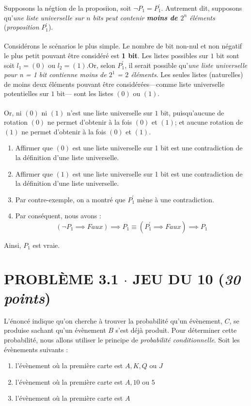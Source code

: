 \documentclass[8pt]{report}
\newcommand{\varitem}[3][black]{%
  \item[%
   \colorbox{#2}{\textcolor{#1}{\makebox(5.5,7){#3}}}%
  ]
}
\begin{document}
        Supposons la négtion de la proposiion, soit $\neg P_1 = P_1^{\prime}$. 
        Autrement dit, supposons qu'\textit{une liste universelle sur 
        $n$ bits peut contenir \textbf{moins de $2^n$} éléments} (\textit{proposition} $P_1^{\prime}$).  
        \\\\ 
        Considérons le scénarios le plus simple. Le nombre de bit non-nul et non négatif le 
        plus petit pouvant être considéré 
        est \textbf{1 bit}. Les listes possibles sur $1$ bit sont soit $l_1= (0)$ ou $l_2 = (1)$.Or, 
        selon $P_1^{\prime}$, il serait possible 
        qu'\textit{une liste universelle pour n = 1 bit contienne moins de $2^1$ = $2$ éléments}. 
        Les seules listes (naturelles) 
        de moins deux éléments pouvant être considérées—comme liste universelle potentielles sur $1$ bit—
        sont les listes $(0)$ ou $(1)$. 
        \\\\
        Or, ni $(0)$ ni $(1)$ n'est une liste universelle sur 
        $1$ bit, puisqu'aucune de rotation $(0)$ ne permet d'obtenir à la fois $(0)$ et $(1)$; et aucune rotation 
        de $(1)$ ne permet d'obtenir à la fois $(0)$ et $(1)$. 
        \begin{enumerate}
            \item Affirmer que $(0)$ est une liste universelle sur 1 bit est une contradiction de la définition 
                d'une liste universelle. 
            \item Affirmer que $(1)$ est une liste universelle sur 1 bit est une contradiction de la définition 
                d'une liste universelle. 
 
            \item Par contre-exemple, on a montré que $P_1^{\prime}$ mène à une contradiction.
            \item Par conséquent, nous avons : 
                \[ (\neg P_1 \implies Faux) \implies P_1 \equiv (P_1^{\prime} \implies Faux) \implies P_1 \]     
        \end{enumerate}
        Ainsi, $P_1$ est vraie. 


\section*{\textnormal{PROBLÈME 3.1 \;\;\;\; $\cdot$ \;\;\;\; JEU DU 10 \hspace*{\fill} (\textit{30 points})}} 

        \noindent L'énoncé indique qu'on cherche à trouver la probabilité qu'un évènement, $C$, se produise 
        sachant qu'un évènement $B$ s'est déjà produit. Pour déterminer cette probabilité, nous allons utiliser 
        le principe de \textit{probabilité conditionnelle}. Soit les évènements suivants : 
        \begin{enumerate}
            \varitem{blue!40}{\textcolor{white}{$C$}} l'évènement où la première carte est $A, K, Q$ ou $J$ 
            \varitem{blue!40}{\textcolor{white}{$B$}} l'évènement où la première carte est $A, 10$ ou $5$
            \varitem{blue!40}{\textcolor{white}{$C^{\prime}$}} l'évènement où la première carte est $A$
        \end{enumerate}
\end{document}
